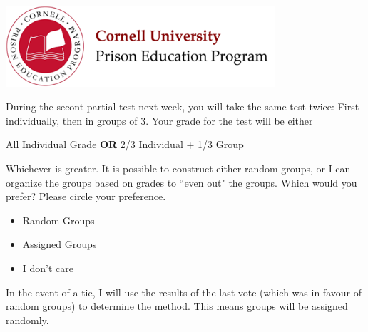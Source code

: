 \documentclass[addpoints,12pt]{exam}
\begin{document}
\footer{}{}{}


\begin{center}
\includegraphics[width=10cm]{../images/logo.png}
\end{center}

\begin{center}
\end{center}

\vspace{0.5in}

During the secont partial test next week, you will take the same test twice: First individually, then in groups of 3. Your grade for the test will be either
\begin{center}
All Individual Grade \textbf{OR} 2/3 Individual + 1/3 Group
\end{center}
Whichever is greater. It is possible to construct either random groups, or I can organize the groups based on grades to ``even out" the groups. Which would you prefer? Please circle your preference.
\begin{itemize}
	\item Random Groups
	\item Assigned Groups
	\item I don't care
\end{itemize}

In the event of a tie, I will use the results of the last vote (which was in favour of random groups) to determine the method. This means groups will be assigned randomly.
\end{document}
